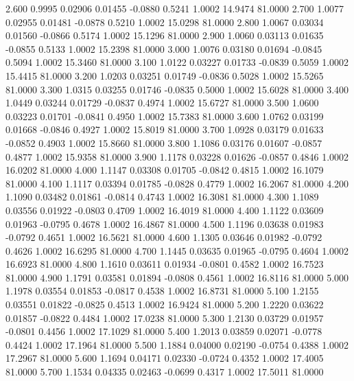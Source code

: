    2.600   0.9995   0.02906   0.01455  -0.0880   0.5241   1.0002  14.9474  81.0000
   2.700   1.0077   0.02955   0.01481  -0.0878   0.5210   1.0002  15.0298  81.0000
   2.800   1.0067   0.03034   0.01560  -0.0866   0.5174   1.0002  15.1296  81.0000
   2.900   1.0060   0.03113   0.01635  -0.0855   0.5133   1.0002  15.2398  81.0000
   3.000   1.0076   0.03180   0.01694  -0.0845   0.5094   1.0002  15.3460  81.0000
   3.100   1.0122   0.03227   0.01733  -0.0839   0.5059   1.0002  15.4415  81.0000
   3.200   1.0203   0.03251   0.01749  -0.0836   0.5028   1.0002  15.5265  81.0000
   3.300   1.0315   0.03255   0.01746  -0.0835   0.5000   1.0002  15.6028  81.0000
   3.400   1.0449   0.03244   0.01729  -0.0837   0.4974   1.0002  15.6727  81.0000
   3.500   1.0600   0.03223   0.01701  -0.0841   0.4950   1.0002  15.7383  81.0000
   3.600   1.0762   0.03199   0.01668  -0.0846   0.4927   1.0002  15.8019  81.0000
   3.700   1.0928   0.03179   0.01633  -0.0852   0.4903   1.0002  15.8660  81.0000
   3.800   1.1086   0.03176   0.01607  -0.0857   0.4877   1.0002  15.9358  81.0000
   3.900   1.1178   0.03228   0.01626  -0.0857   0.4846   1.0002  16.0202  81.0000
   4.000   1.1147   0.03308   0.01705  -0.0842   0.4815   1.0002  16.1079  81.0000
   4.100   1.1117   0.03394   0.01785  -0.0828   0.4779   1.0002  16.2067  81.0000
   4.200   1.1090   0.03482   0.01861  -0.0814   0.4743   1.0002  16.3081  81.0000
   4.300   1.1089   0.03556   0.01922  -0.0803   0.4709   1.0002  16.4019  81.0000
   4.400   1.1122   0.03609   0.01963  -0.0795   0.4678   1.0002  16.4867  81.0000
   4.500   1.1196   0.03638   0.01983  -0.0792   0.4651   1.0002  16.5621  81.0000
   4.600   1.1305   0.03646   0.01982  -0.0792   0.4626   1.0002  16.6295  81.0000
   4.700   1.1445   0.03635   0.01965  -0.0795   0.4604   1.0002  16.6923  81.0000
   4.800   1.1610   0.03611   0.01934  -0.0801   0.4582   1.0002  16.7523  81.0000
   4.900   1.1791   0.03581   0.01894  -0.0808   0.4561   1.0002  16.8116  81.0000
   5.000   1.1978   0.03554   0.01853  -0.0817   0.4538   1.0002  16.8731  81.0000
   5.100   1.2155   0.03551   0.01822  -0.0825   0.4513   1.0002  16.9424  81.0000
   5.200   1.2220   0.03622   0.01857  -0.0822   0.4484   1.0002  17.0238  81.0000
   5.300   1.2130   0.03729   0.01957  -0.0801   0.4456   1.0002  17.1029  81.0000
   5.400   1.2013   0.03859   0.02071  -0.0778   0.4424   1.0002  17.1964  81.0000
   5.500   1.1884   0.04000   0.02190  -0.0754   0.4388   1.0002  17.2967  81.0000
   5.600   1.1694   0.04171   0.02330  -0.0724   0.4352   1.0002  17.4005  81.0000
   5.700   1.1534   0.04335   0.02463  -0.0699   0.4317   1.0002  17.5011  81.0000
